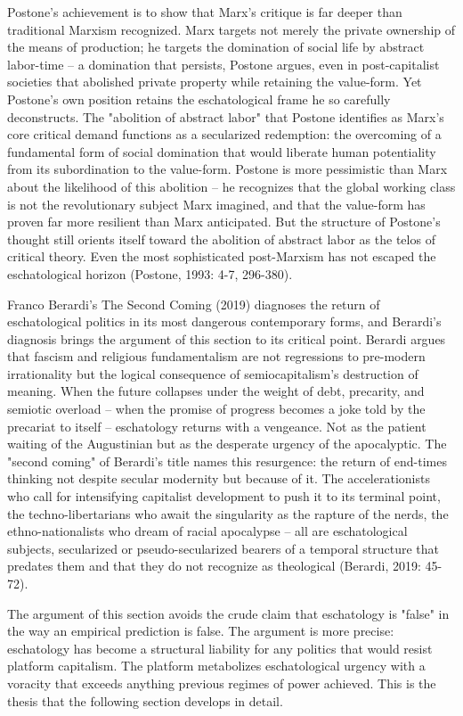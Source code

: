 Postone's achievement is to show that Marx's critique is far deeper than traditional Marxism recognized. Marx targets not merely the private ownership of the means of production; he targets the domination of social life by abstract labor-time -- a domination that persists, Postone argues, even in post-capitalist societies that abolished private property while retaining the value-form. Yet Postone's own position retains the eschatological frame he so carefully deconstructs. The "abolition of abstract labor" that Postone identifies as Marx's core critical demand functions as a secularized redemption: the overcoming of a fundamental form of social domination that would liberate human potentiality from its subordination to the value-form. Postone is more pessimistic than Marx about the likelihood of this abolition -- he recognizes that the global working class is not the revolutionary subject Marx imagined, and that the value-form has proven far more resilient than Marx anticipated. But the structure of Postone's thought still orients itself toward the abolition of abstract labor as the telos of critical theory. Even the most sophisticated post-Marxism has not escaped the eschatological horizon (Postone, 1993: 4-7, 296-380).

Franco Berardi's The Second Coming (2019) diagnoses the return of eschatological politics in its most dangerous contemporary forms, and Berardi's diagnosis brings the argument of this section to its critical point. Berardi argues that fascism and religious fundamentalism are not regressions to pre-modern irrationality but the logical consequence of semiocapitalism's destruction of meaning. When the future collapses under the weight of debt, precarity, and semiotic overload -- when the promise of progress becomes a joke told by the precariat to itself -- eschatology returns with a vengeance. Not as the patient waiting of the Augustinian but as the desperate urgency of the apocalyptic. The "second coming" of Berardi's title names this resurgence: the return of end-times thinking not despite secular modernity but because of it. The accelerationists who call for intensifying capitalist development to push it to its terminal point, the techno-libertarians who await the singularity as the rapture of the nerds, the ethno-nationalists who dream of racial apocalypse -- all are eschatological subjects, secularized or pseudo-secularized bearers of a temporal structure that predates them and that they do not recognize as theological (Berardi, 2019: 45-72).

The argument of this section avoids the crude claim that eschatology is "false" in the way an empirical prediction is false. The argument is more precise: eschatology has become a structural liability for any politics that would resist platform capitalism. The platform metabolizes eschatological urgency with a voracity that exceeds anything previous regimes of power achieved. This is the thesis that the following section develops in detail.

